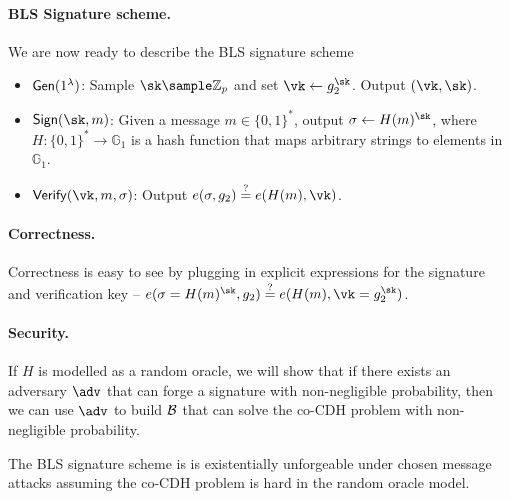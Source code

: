 \paragraph{BLS Signature scheme.} We are now ready to describe the BLS signature scheme%
\begin{itemize}
    \item $\mathsf{Gen}(1^\lambda)$: Sample $\sk \sample \mathbb{Z}_p$ and set $\vk \gets g_2^\sk$. Output $(\vk, \sk)$.
    \item $\Sign(\sk, m)$: Given a message $m \in \{0,1\}^*$, output $\sigma \gets H(m)^{\sk}$, where $H: \{0,1\}^* \to \mathbb{G}_1$ is a hash function that maps arbitrary strings to elements in $\mathbb{G}_1$.
    \item $\Verify(\vk, m, \sigma)$: Output $e(\sigma, g_2) \stackrel{?}{=} e(H(m), \vk)$.
\end{itemize}

\paragraph{Correctness.} Correctness is easy to see by plugging in explicit expressions for the signature and verification key -- $e(\sigma=H(m)^\sk, g_2) \stackrel{?}{=} e(H(m), \vk=g_2^\sk)$.

\paragraph{Security.} If $H$ is modelled as a random oracle, we will show that if there exists an adversary $\adv$ that can forge a signature with non-negligible probability, then we can use $\adv$ to build $\mathcal{B}$ that can solve the co-CDH problem with non-negligible probability.

\begin{theorem}
    The BLS signature scheme is is existentially unforgeable under chosen message attacks assuming the co-CDH problem is hard in the random oracle model.
\end{theorem}

